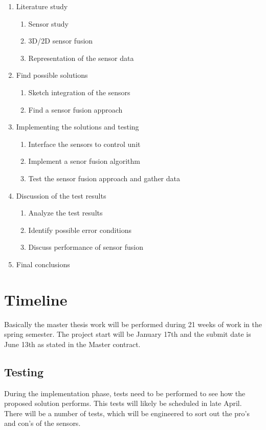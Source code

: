 \documentclass[a4paper, 10pt]{article}
\begin{document}
\begin{enumerate}
    \item Literature study
        \begin{enumerate}
            \item Sensor study
            \item 3D/2D sensor fusion
            \item Representation of the sensor data
        \end{enumerate}
    \item Find possible solutions
        \begin{enumerate}
            \item Sketch integration of the sensors
            \item Find a sensor fusion approach
        \end{enumerate}
    \item Implementing the solutions and testing
        \begin{enumerate}
            \item Interface the sensors to control unit
            \item Implement a senor fusion algorithm
            \item Test the sensor fusion approach and gather data
        \end{enumerate}
    \item Discussion of the test results
        \begin{enumerate}
            \item Analyze the test results
            \item Identify possible error conditions
            \item Discuss performance of sensor fusion
        \end{enumerate}
    \item Final conclusions
\end{enumerate}


\section{Timeline}
Basically the master thesis work will be performed during 21 weeks of work in the spring
semester. The project start will be January 17th and the submit date is June 13th as stated in the
Master contract. 

\subsection{Testing}
During the implementation phase, tests need to be performed to see how the proposed
solution performs. This tests will likely be scheduled in late April. There will be a number of
tests, which will be engineered to sort out the pro's and con's of the sensors. 
\end{document}
